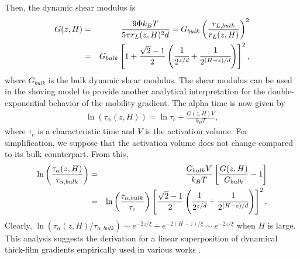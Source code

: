 \documentclass[twocolumn,preprintnumbers,amsmath,amssymb,superscriptaddress]{revtex4}
\begin{document}
Then, the dynamic shear modulus is \cite{12}
\begin{eqnarray}
G(z,H) &=& \frac{9\Phi k_BT}{5\pi r_L(z,H)^2d}=G_{bulk}\left(\frac{r_{L,bulk}}{r_L(z,H)} \right)^2 \nonumber\\
&=& G_{bulk}\left[1+\frac{\sqrt{2}-1}{2}\left(\cfrac{1}{2^{z/d}}+\cfrac{1}{2^{(H-z)/d}}\right)\right]^2,
\label{eq:7}
\end{eqnarray}
where $G_{bulk}$ is the bulk dynamic shear modulus. The shear modulus can be used in the shoving model to provide another analytical interpretation for the double-exponential behavior of the mobility gradient. The alpha time is now given by
\begin{eqnarray}
\ln\left(\tau_\alpha(z,H)\right) = \ln\tau_{c} + \frac{G(z,H)V}{k_BT},
\label{eq:8}
\end{eqnarray}
where $\tau_{c}$ is a characteristic time and $V$ is the activation volume. For simplification, we suppose that the activation volume does not change compared to its bulk counterpart. From this, 
\begin{eqnarray}
\ln\left(\frac{\tau_\alpha(z,H)}{\tau_{\alpha,bulk}}\right) &=& \frac{G_{bulk}V}{k_BT}\left[\frac{G(z,H)}{G_{bulk}}-1\right] \nonumber\\ &=&  \ln\left(\frac{\tau_{\alpha,bulk}}{\tau_{c}}\right)\left[\frac{\sqrt{2}-1}{2}\left(\cfrac{1}{2^{z/d}}+\cfrac{1}{2^{(H-z)/d}}\right)\right]^2. \nonumber\\
\label{eq:9}
\end{eqnarray}
Clearly, $\ln(\tau_\alpha(z,H)/\tau_{\alpha,bulk}) \sim e^{-2z/\xi}+e^{-2(H-z)/\xi} \sim e^{-2z/\xi}$ when $H$ is large. This analysis suggests the derivation for a linear superposition of dynamical thick-film gradients empirically used in various works \cite{24,17}. 
\end{document}
